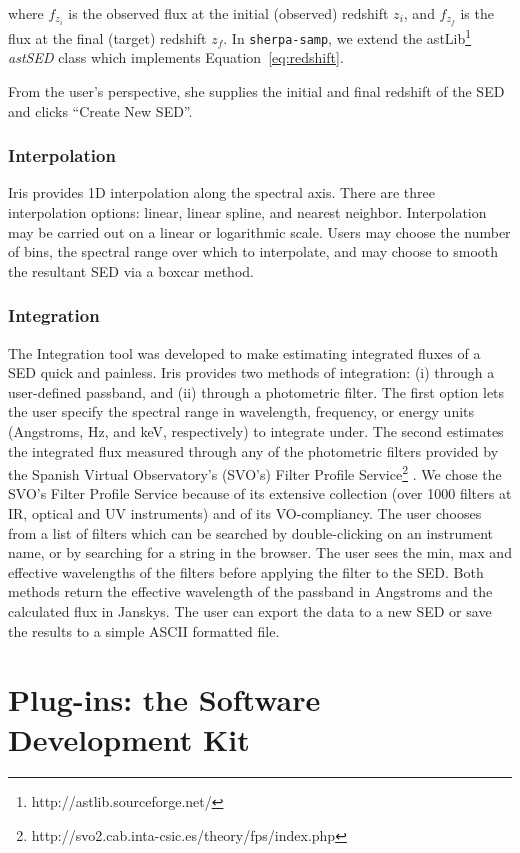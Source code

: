 \documentclass[5p]{elsarticle}
\begin{document}
where $f_{z_i}$ is the observed flux at the initial (observed) redshift $z_i$, and $f_{z_f}$ is the flux at the final (target) redshift $z_f$. In \verb|sherpa-samp|, we extend the astLib\footnote{http://astlib.sourceforge.net/} \textit{astSED} class which implements Equation~\ref{eq:redshift}.

From the user's perspective, she supplies the initial and final redshift of the SED and clicks ``Create New SED''.

\subsubsection{Interpolation}
Iris provides 1D interpolation along the spectral axis. There are three interpolation options: linear, linear spline, and nearest neighbor. Interpolation may be carried out on a linear or logarithmic scale. Users may choose the number of bins, the spectral range over which to interpolate, and may choose to smooth the resultant SED via a boxcar method.

\subsubsection{Integration}
The Integration tool was developed to make estimating integrated fluxes of a SED quick and painless. Iris provides two methods of integration: (i) through a user-defined passband, and (ii) through a photometric filter. The first option lets the user specify the spectral range in wavelength, frequency, or energy units (Angstroms, Hz, and keV, respectively) to integrate under. The second estimates the integrated flux measured through any of the photometric filters provided by the Spanish Virtual Observatory's (SVO's) Filter Profile Service\footnote{http://svo2.cab.inta-csic.es/theory/fps/index.php} \citep{2013arXiv1312.3249S}. We chose the SVO's Filter Profile Service because of its extensive collection (over 1000 filters at IR, optical and UV instruments) and of its VO-compliancy. The user chooses from a list of filters which can be searched by double-clicking on an instrument name, or by searching for a string in the browser. The user sees the min, max and effective wavelengths of the filters before applying the filter to the SED.
Both methods return the effective wavelength of the passband in Angstroms and the calculated flux in Janskys. The user can export the data to a new SED or save the results to a simple ASCII formatted file.

\section{Plug-ins: the Software Development Kit}
\label{sec:plugins}
\end{document}
